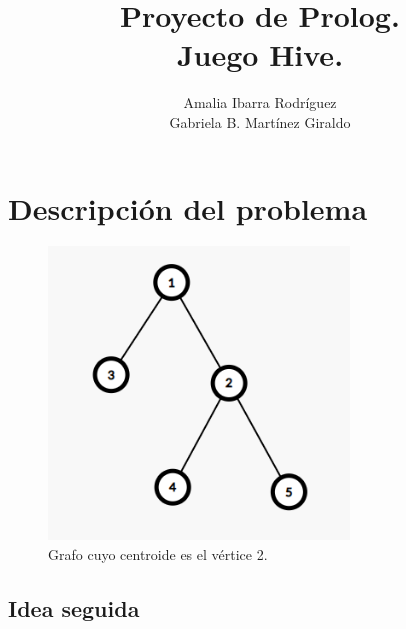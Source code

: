 \documentclass[runningheads,a4paper]{llncs}
\begin{document}
\renewcommand{\abstractname}{Resumen.}
\renewcommand{\keywordname}{\textbf{Palabras Clave:}}
\renewcommand{\refname}{Referencias}
\renewcommand{\tablename}{Tabla}

\mainmatter  %

\title{Proyecto de Prolog.\\Juego Hive.}


\author{Amalia Ibarra Rodr\'iguez\\
	Gabriela B. Mart\'inez Giraldo}


\maketitle


\section{Descripción del problema}\label{sec:ex1}

\begin{figure}
	\centering
	\includegraphics[width = 8cm]{images/lcc1.png}
	\caption{Grafo cuyo centroide es el v\'ertice 2.}\label{fig:lcc1}
\end{figure}


\subsection{Idea seguida}
\end{document}

